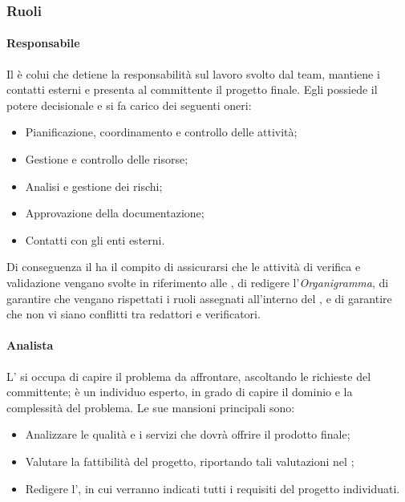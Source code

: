 \subsubsection{Ruoli}
\paragraph{Responsabile} \label{responsabile_progetto}
Il \RdP{} è colui che detiene la responsabilità sul lavoro svolto dal team, mantiene i contatti esterni e presenta al committente il progetto finale. Egli possiede il potere decisionale e si fa carico dei seguenti oneri:
\begin{itemize}
	\item Pianificazione, coordinamento e controllo delle attività;
	\item Gestione e controllo delle risorse;
	\item Analisi e gestione dei rischi;
	\item Approvazione della documentazione;
	\item Contatti con gli enti esterni.
\end{itemize}
Di conseguenza il \RdP{} ha il compito di assicurarsi che le attività di verifica e validazione vengano svolte in riferimento alle \NdP{}, di redigere l'\emph{{{Organigramma}}}, di garantire che vengano rispettati i ruoli assegnati all'interno del \PdP, e di garantire che non vi siano conflitti tra redattori e verificatori. 

\paragraph{Analista}
L'\ana{} si occupa di capire il problema da affrontare, ascoltando le richieste del committente; è un individuo esperto, in grado di capire il dominio e la complessità del problema. Le sue mansioni principali sono:
\begin{itemize}
	\item Analizzare le qualità e i servizi che dovrà offrire il prodotto finale;
	\item Valutare la fattibilità del progetto, riportando tali valutazioni nel \SdF{};
	\item Redigere l'\AdR{}, in cui verranno indicati tutti i requisiti del progetto individuati.
\end{itemize}

